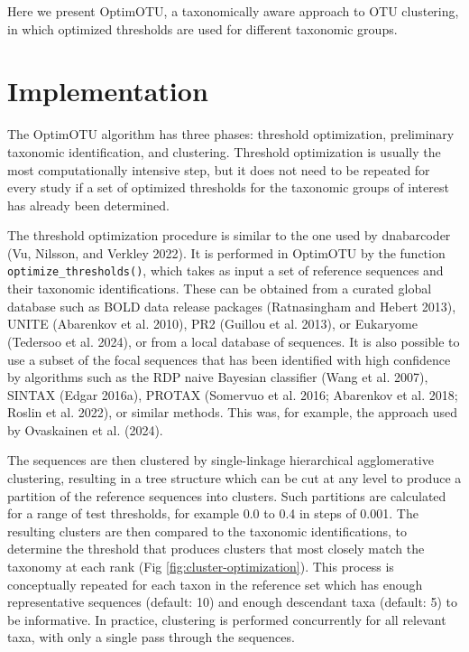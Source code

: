 \documentclass[
]{article}
\begin{document}
Here we present OptimOTU, a taxonomically aware approach to OTU clustering, in which optimized thresholds are used for different taxonomic groups.

\section{Implementation}\label{implementation}

The OptimOTU algorithm has three phases: threshold optimization, preliminary taxonomic identification, and clustering.
Threshold optimization is usually the most computationally intensive step, but it does not need to be repeated for every study if a set of optimized thresholds for the taxonomic groups of interest has already been determined.

The threshold optimization procedure is similar to the one used by dnabarcoder (Vu, Nilsson, and Verkley 2022).
It is performed in OptimOTU by the function \texttt{optimize\_thresholds()}, which takes as input a set of reference sequences and their taxonomic identifications.
These can be obtained from a curated global database such as BOLD data release packages (Ratnasingham and Hebert 2013), UNITE (Abarenkov et al. 2010), PR2 (Guillou et al. 2013), or Eukaryome (Tedersoo et al. 2024), or from a local database of sequences.
It is also possible to use a subset of the focal sequences that has been identified with high confidence by algorithms such as the RDP naive Bayesian classifier (Wang et al. 2007), SINTAX (Edgar 2016a), PROTAX (Somervuo et al. 2016; Abarenkov et al. 2018; Roslin et al. 2022), or similar methods.
This was, for example, the approach used by Ovaskainen et al. (2024).

The sequences are then clustered by single-linkage hierarchical agglomerative clustering, resulting in a tree structure which can be cut at any level to produce a partition of the reference sequences into clusters.
Such partitions are calculated for a range of test thresholds, for example 0.0 to 0.4 in steps of 0.001.
The resulting clusters are then compared to the taxonomic identifications, to determine the threshold that produces clusters that most closely match the taxonomy at each rank (Fig \ref{fig:cluster-optimization}).
This process is conceptually repeated for each taxon in the reference set which has enough representative sequences (default: 10) and enough descendant taxa (default: 5) to be informative.
In practice, clustering is performed concurrently for all relevant taxa, with only a single pass through the sequences.
\end{document}
